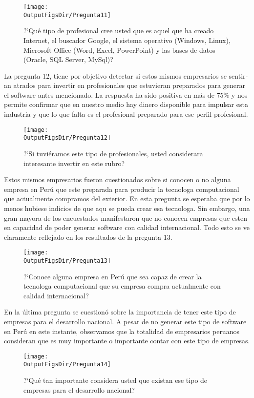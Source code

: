 \begin{figure}[!h]
	\centering
	\texttt{[image: \\OutputFigsDir/Pregunta11]}
	\label{fig:Preg11}
	\caption{?`Qué tipo de profesional cree usted que es aquel que ha creado Internet, el buscador Google, el sistema operativo (Windows, Linux), Microsoft Office (Word, Excel, PowerPoint) y las bases de datos (Oracle, SQL Server, MySql)?}
\end{figure}

La pregunta 12, tiene por objetivo detectar si estos mismos empresarios se sentir­an atra­dos para invertir en profesionales que estuvieran preparados para generar el software antes mencionado. La respuesta ha sido positiva en más de 75\% y nos permite confirmar que en nuestro medio hay dinero disponible para impulsar esta industria y que lo que falta es el profesional preparado para ese perfil profesional.

\begin{figure}[!h]
	\centering
	\texttt{[image: \\OutputFigsDir/Pregunta12]}
	\label{fig:Preg12}
	\caption{?`Si tuviéramos este tipo de profesionales, usted considerar­a interesante invertir en este rubro?}
\end{figure}

Estos mismos empresarios fueron cuestionados sobre si conocen o no alguna empresa en Perú que este preparada para producir la tecnolog­a computacional que actualmente compramos del exterior. En esta pregunta se esperaba que por lo menos hubiese indicios de que aqu­ se pueda crear esa tecnolog­a. Sin embargo, una gran mayor­a de los encuestados manifestaron que no conocen empresas que esten en capacidad de poder generar software con calidad internacional. Todo esto se ve claramente reflejado en los resultados de la pregunta 13.

\begin{figure}[!h]
	\centering
	\texttt{[image: \\OutputFigsDir/Pregunta13]}
	\label{fig:Preg13}
	\caption{?`Conoce alguna empresa en Perú que sea capaz de crear la tecnolog­a computacional que su empresa compra actualmente con calidad internacional?}
\end{figure}

En la última pregunta se cuestionó sobre la importancia de tener este tipo de empresas para el desarrollo nacional. A pesar de no generar este tipo de software en Perú en este instante, observamos que la totalidad de empresarios peruanos consideran que es muy importante o importante contar con este tipo de empresas.

\begin{figure}[!h]
	\centering
	\texttt{[image: \\OutputFigsDir/Pregunta14]}
	\label{fig:Preg14}
	\caption{?`Qué tan importante considera usted que existan ese tipo de empresas para el desarrollo nacional?}
\end{figure}


